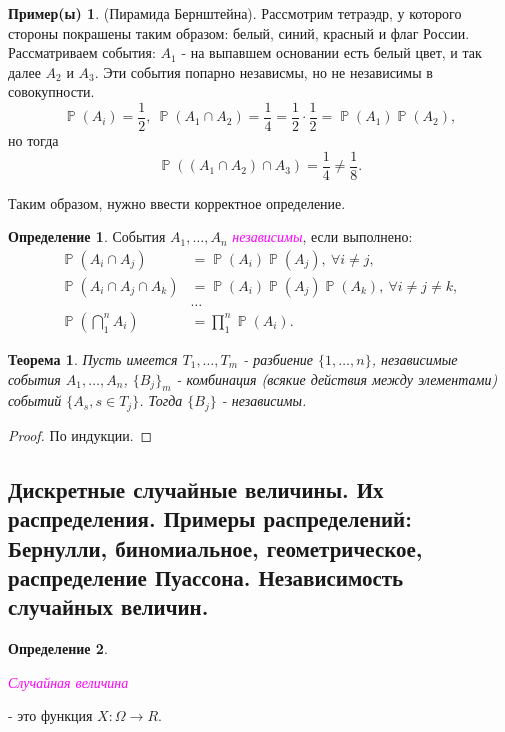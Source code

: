 \documentclass[a4paper,100pt]{article}
\theoremstyle{indented}
\newtheorem{theorem}{Теорема}
\theoremstyle{definition}
\newtheorem{defn}{Определение}
\newtheorem{exl}{Пример(ы)}
\theoremstyle{remark}
\DeclareMathOperator{\PP}{\mathbb{P}}
\begin{document}
\begin{exl}
    (Пирамида Бернштейна). Рассмотрим тетраэдр, у которого стороны покрашены таким образом: белый, синий, красный и флаг России. Рассматриваем события: $A_1$ - на выпавшем основании есть белый цвет, и так далее $A_2$ и $A_3$. Эти события попарно независмы, но не независимы в совокупности.
    \[
        \PP(A_i)=\frac{1}{2}, \: \PP(A_1\cap A_2)=\frac14=\frac12\cdot\frac12=\PP(A_1)\PP(A_2), 
    \]
    но тогда 
    \[
        \PP((A_1\cap A_2)\cap A_3)=\frac14\neq\frac18.
    \]
\end{exl}

Таким образом, нужно ввести корректное определение.

\begin{defn}
    События $A_1, \dots, A_n$ \hypertarget{n7}{\textcolor{magenta}{\textit{независимы}}}, если выполнено:
    \begin{align*}
        \PP(A_i\cap A_j)&=\PP(A_i)\PP(A_j), \: \forall i\neq j,  \\ 
        \PP(A_i\cap A_j\cap A_k)&=\PP(A_i)\PP(A_j)\PP(A_k), \: \forall i\neq j\neq k,  \\
        &\dots \\
        \PP(\bigcap_1^n A_i)&=\prod_1^n \PP(A_i).
    \end{align*}
\end{defn}

\begin{theorem}
    Пусть имеется $T_1, \ldots, T_m$ - разбиение $\{1, \ldots, n\}$, независимые события $A_1, \ldots, A_n$, $\{B_j\}_m$ - комбинация (всякие действия между элементами) событий $\{A_s, s\in T_j\}$. Тогда $\{B_j\}$ - независимы.
\end{theorem}

\begin{proof}
    По индукции.
\end{proof}

\subsection{Дискретные случайные величины. Их распределения. Примеры распределений: Бернулли, биномиальное, геометрическое, распределение Пуассона. Независимость случайных величин.} 

\begin{defn}
  \hypertarget{n8}{\textcolor{magenta}{\textit{Случайная величина}}} - это функция $X:\Omega\rightarrow R$. 
\end{defn}
\end{document}
